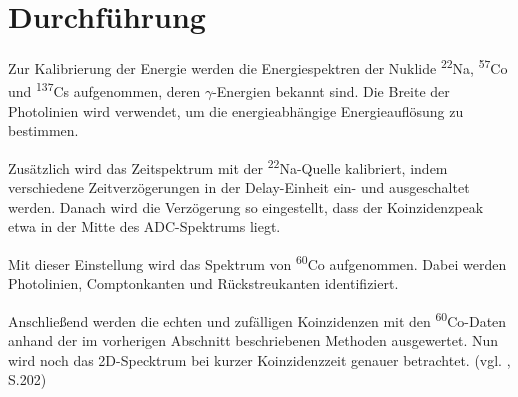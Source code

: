\chapter{Durchführung}
Zur Kalibrierung der Energie werden die Energiespektren der Nuklide \textsuperscript{22}Na, \textsuperscript{57}Co und \textsuperscript{137}Cs aufgenommen, deren $\gamma$-Energien bekannt sind. Die Breite der Photolinien wird verwendet, um die energieabhängige Energieauflösung zu bestimmen.

Zusätzlich wird das Zeitspektrum mit der \textsuperscript{22}Na-Quelle kalibriert, indem verschiedene Zeitverzögerungen in der Delay-Einheit ein- und ausgeschaltet werden. Danach wird die Verzögerung so eingestellt, dass der Koinzidenzpeak etwa in der Mitte des ADC-Spektrums liegt.

Mit dieser Einstellung wird das Spektrum von \textsuperscript{60}Co aufgenommen. Dabei werden Photolinien, Comptonkanten und Rückstreukanten identifiziert.

Anschließend werden die echten und zufälligen Koinzidenzen mit den \textsuperscript{60}Co-Daten anhand der im vorherigen Abschnitt beschriebenen Methoden ausgewertet. Nun wird noch das 2D-Specktrum bei kurzer Koinzidenzzeit genauer betrachtet. (vgl.   \cite{Vorbereitungshilfe}, S.202)
